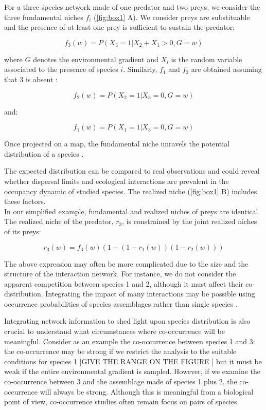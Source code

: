 For a three species network made of one predator and two preys, we
consider the three fundamental niches \(f_i\) (\ref{fig:box1} A). We
consider preys are substituable and the presence of at least one prey is
sufficient to sustain the predator:

\[f_3(w)=P(X_3=1|X_2+X_1>0, G=w)\]

where \(G\) denotes the environmental gradient and \(X_i\) is the random
variable associated to the presence of species \(i\). Similarly, \(f_1\)
and \(f_2\) are obtained assuming that 3 is absent :

\[f_2(w)=P(X_2=1|X_3=0, G=w)\]

and:

\[f_1(w)=P(X_1=1|X_3=0, G=w)\]

Once projected on a map, the fundamental niche unravels the potential
distribution of a species \citep{Kearney2004}.

The expected distribution can be compared to real observations and could
reveal whether dispersal limits and ecological interactions are
prevalent in the occupancy dynamic of studied species. The realized
niche (\ref{fig:box1} B) includes these factors.\\
In our simplified example, fundamental and realized niches of preys are
identical. The realized niche of the predator, \(r_3\), is constrained
by the joint realized niches of its preys:

\[r_3(w)=f_3(w)\left(1-(1-r_1(w))(1-r_2(w))\right)\]

The above expression may often be more complicated due to the size and
the structure of the interaction network. For instance, we do not
consider the apparent competition between species 1 and 2, although it
must affect their co-distribution. Integrating the impact of many
interactions may be possible using occurrence probabilities of species
assemblages rather than single species \citep{Cazelles2015b}.

Integrating network information to shed light upon species distribution
is also crucial to understand what circumstances where co-occurrence
will be meaningful. Consider as an example the co-occurrence between
species 1 and 3: the co-occurrence may be strong if we restrict the
analysis to the suitable conditions for species 1 {[}GIVE THE RANGE ON
THE FIGURE {]} but it must be weak if the entire environmental gradient
is sampled. However, if we examine the co-occurrence between 3 and the
assemblage made of species 1 plus 2, the co-occurrence will always be
strong. Although this is meaningful from a biological point of view,
co-occurrence studies often remain focus on pairs of species.

